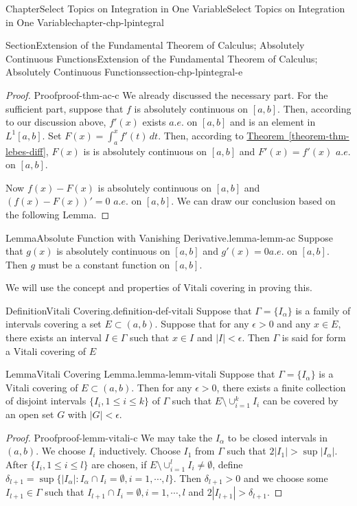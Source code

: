 \documentclass[oneside,10pt,]{book}
\newcommand{\xreffont}{\relax}
\numberwithin{equation}{section}
\begin{document}
\begin{chapterptx}{Chapter}{Select Topics on Integration in One Variable}{}{Select Topics on Integration in One Variable}{}{}{chapter-chp-lpintegral}
\begin{sectionptx}{Section}{Extension of the Fundamental Theorem of Calculus; Absolutely Continuous Functions}{}{Extension of the Fundamental Theorem of Calculus; Absolutely Continuous Functions}{}{}{section-chp-lpintegral-e}
\begin{proof}{Proof}{}{proof-thm-ac-c}
We already discussed the necessary	part. For the sufficient part, suppose that \(f\) is absolutely continuous on \([a, b]\). Then, according to our discussion above, \(f'(x)\) exists \(a.e.\) on \([a, b]\) and is an element in \(L^{1}[a,  b]\). Set \(F(x)=\int_{a}^{x} f'(t)\, dt\). Then, according to \hyperref[theorem-thm-lebes-diff]{Theorem~{\xreffont\ref{theorem-thm-lebes-diff}}}, \(F(x)\) is is absolutely continuous on \([a, b]\) and \(F'(x)=f'(x)\) \(a.e.\) on \([a, b]\).%
\par
Now \(f(x)-F(x)\) is  absolutely continuous on \([a, b]\) and \((f(x)-F(x))'=0\) \(a.e.\) on \([a, b]\). We can draw our conclusion based on the following Lemma.%
\end{proof}
\begin{lemma}{Lemma}{Absolute Function with Vanishing Derivative.}{}{lemma-lemm-ac}%
Suppose that \(g(x)\) is absolutely continuous on \([a, b]\) and \(g'(x)=0\)\(a.e.\) on \([a, b]\). Then \(g\) must be a constant function on \([a, b]\).\end{lemma}
We will use the concept and properties of Vitali covering in proving this.%
\begin{definition}{Definition}{Vitali Covering.}{definition-def-vitali}%
Suppose that \(\Gamma =\{I_{\alpha}\}\) is a family of intervals covering a set \(E\subset (a,b)\). Suppose that for any \(\epsilon >0\) and any \(x\in E\), there exists an interval \(I\in \Gamma\) such that \(x\in I\) and \(|I| < \epsilon\). Then \(\Gamma\) is said for form a Vitali covering of \(E\)%
\end{definition}
\begin{lemma}{Lemma}{Vitali Covering Lemma.}{}{lemma-lemm-vitali}%
Suppose that \(\Gamma =\{I_{\alpha}\}\) is a Vitali covering of \(E\subset (a,b)\). Then for any \(\epsilon > 0\), there exists a finite collection of disjoint intervals \(\{I_{i}, 1\le i \le k\}\) of \(\Gamma\) such that \(E\setminus \cup_{i=1}^{k}I_{i}\) can be covered by an open set \(G\) with \(|G| < \epsilon\).\end{lemma}
\begin{proof}{Proof}{}{proof-lemm-vitali-c}
We may take the \(I_{\alpha}\) to be closed intervals in \((a, b)\). We choose \(I_{i}\) inductively. Choose \(I_{1}\) from \(\Gamma\) such that \(2|I_{1}| > \sup |I_{\alpha}|\).  After \(\{I_{i}, 1\le i \le l\}\) are chosen, if \(E\setminus \cup_{i=1}^{l}I_{i} \ne \emptyset\), define \(\delta_{l+1}=\sup\{|I_{\alpha}|: I_{\alpha} \cap I_{i} =\emptyset, i=1,\cdots, l\}\). Then \(\delta_{l+1} > 0\) and we choose some \(I_{l+1}\in \Gamma\) such that \(I_{l+1} \cap I_{i} =\emptyset, i=1,\cdots, l\) and \(2|I_{l+1}| > \delta_{l+1}\).%

\end{proof}
\end{sectionptx}
\end{chapterptx}
\end{document}

